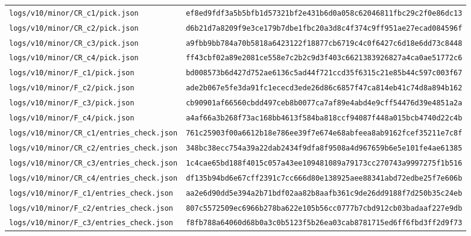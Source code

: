 \documentclass[11pt,a4paper]{article}
\newcommand{\loc}[1]{\nolinkurl{#1}}
\theoremstyle{plain}
\theoremstyle{definition}
\theoremstyle{remark}
\numberwithin{equation}{section}
\begin{document}
{\begin{longtable}{@{}p{.50\linewidth}p{.46\linewidth}@{}}
{\scriptsize\loc{logs/v10/minor/CR_c1/pick.json}} & \texttt{\tiny ef8ed9fdf3a5b5bfb1d57321bf2e431b6d0a058c62046811fbc29c2f0e86dc13}\\
{\scriptsize\loc{logs/v10/minor/CR_c2/pick.json}} & \texttt{\tiny d6b21d7a8209f9e3ce179b7dbe1fbc20a3d8c4f374c9ff951ae27ecad084596f}\\
{\scriptsize\loc{logs/v10/minor/CR_c3/pick.json}} & \texttt{\tiny a9fbb9bb784a70b5818a6423122f18877cb6719c4c0f6427c6d18e6dd73c8448}\\
{\scriptsize\loc{logs/v10/minor/CR_c4/pick.json}} & \texttt{\tiny ff43cbf02a89e2081ce558e7c2b2c9d3f403c6621383926827a4ca0ae51772c6}\\
{\scriptsize\loc{logs/v10/minor/F_c1/pick.json}} & \texttt{\tiny bd008573b6d427d752ae6136c5ad44f721ccd35f6315c21e85b44c597c003f67}\\
{\scriptsize\loc{logs/v10/minor/F_c2/pick.json}} & \texttt{\tiny ade2b067e5fe3da91fc1ececd3ede26d86c6857f47ca814eb41c74d8a894b162}\\
{\scriptsize\loc{logs/v10/minor/F_c3/pick.json}} & \texttt{\tiny cb90901af66560cbdd497ceb8b0077ca7af89e4abd4e9cff54476d39e4851a2a}\\
{\scriptsize\loc{logs/v10/minor/F_c4/pick.json}} & \texttt{\tiny a4af66a3b268f73ac168bb4613f584ba818ccf94087f448a015bcb4740d22c4b}\\
{\scriptsize\loc{logs/v10/minor/CR_c1/entries_check.json}} & \texttt{\tiny 761c25903f00a6612b18e786ee39f7e674e68abfeea8ab9162fcef35211e7c8f}\\
{\scriptsize\loc{logs/v10/minor/CR_c2/entries_check.json}} & \texttt{\tiny 348bc38ecc754a39a22dab2434f9dfa8f9508a4d967659b6e5e101fe4ae61385}\\
{\scriptsize\loc{logs/v10/minor/CR_c3/entries_check.json}} & \texttt{\tiny 1c4cae65bd188f4015c057a43ee109481089a79173cc270743a9997275f1b516}\\
{\scriptsize\loc{logs/v10/minor/CR_c4/entries_check.json}} & \texttt{\tiny df135b94bd6e67cff2391c7cc666d80e138925aee88341abd72edbe25f7e606b}\\
{\scriptsize\loc{logs/v10/minor/F_c1/entries_check.json}} & \texttt{\tiny aa2e6d90dd5e394a2b71bdf02aa82b8aafb361c9de26dd9188f7d250b35c24eb}\\
{\scriptsize\loc{logs/v10/minor/F_c2/entries_check.json}} & \texttt{\tiny 807c5572509ec6966b278ba622e105b56cc0777b7cbd912cb03badaaf227e9db}\\
{\scriptsize\loc{logs/v10/minor/F_c3/entries_check.json}} & \texttt{\tiny f8fb788a64060d68b0a3c0b5123f5b26ea03cab8781715ed6ff6fbd3ff2d9f73}\\

\end{longtable}}
\end{document}
